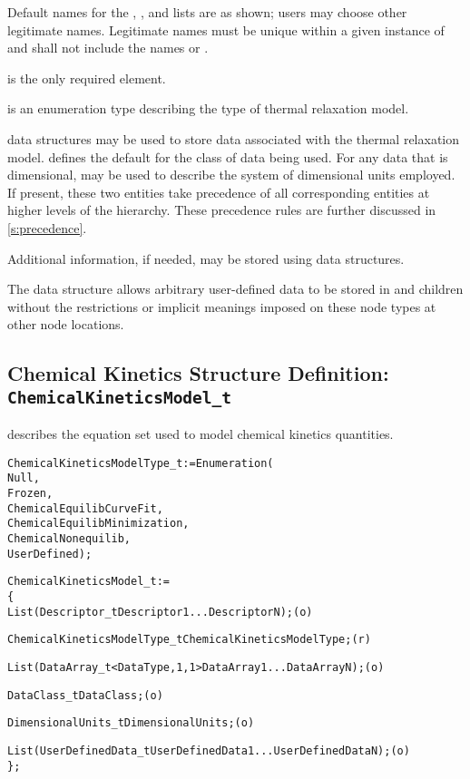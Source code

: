 \begin{notes}
\item
 Default names for the , , and
 lists are as shown; users may choose other legitimate names.
 Legitimate names must be unique within a given instance of
  and shall not include the names
  or .
\item
  is the only required element.
\end{notes}

 is an enumeration type describing
the type of thermal relaxation model.

 data structures may be used to store data associated
with the thermal relaxation model.
 defines the default for the class of data being used.
For any data that is dimensional,  may be used to
describe the system of dimensional units employed.
If present, these two entities take precedence of all corresponding
entities at higher levels of the hierarchy.
These precedence rules are further discussed in \autoref{s:precedence}.

Additional information, if needed, may be stored using
 data structures.

The  data structure allows arbitrary
user-defined data to be stored in  and
 children without the restrictions or implicit
meanings imposed on these node types at other node locations.

\subsection{Chemical Kinetics Structure Definition: \texttt{ChemicalKineticsModel\_t}}
\label{s:ChemicalKineticsModel}

 describes the equation set used to model
chemical kinetics quantities.
\begin{alltt}
  ChemicalKineticsModelType\_t := Enumeration(
    Null,
    Frozen,
    ChemicalEquilibCurveFit,
    ChemicalEquilibMinimization,
    ChemicalNonequilib,
    UserDefined ) ;
\end{alltt}

\begin{alltt}
  ChemicalKineticsModel\_t :=
    \{
    List( Descriptor\_t Descriptor1 ... DescriptorN ) ;                      (o)

    ChemicalKineticsModelType\_t ChemicalKineticsModelType ;                 (r)
    
    List( DataArray\_t<DataType, 1, 1> DataArray1 ... DataArrayN ) ;         (o)

    DataClass\_t DataClass ;                                                 (o)
                
    DimensionalUnits\_t DimensionalUnits ;                                   (o)

    List( UserDefinedData\_t UserDefinedData1 ... UserDefinedDataN ) ;       (o)
    \} ;
\end{alltt}

